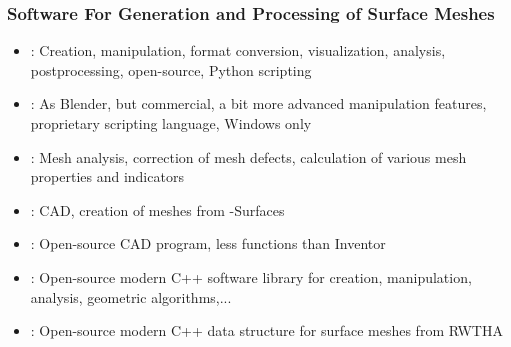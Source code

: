 \begin{frame}
\frametitle{Software For Generation and Processing of Surface Meshes}

\begin{itemize}
	\item {}: Creation, manipulation, format conversion, visualization, analysis, postprocessing, open-source, Python scripting
	\item {}: As Blender, but commercial, a bit more advanced manipulation features, proprietary scripting language, Windows only
	\item {}: Mesh analysis, correction of mesh defects, calculation of various mesh properties and indicators
	\item {}: CAD, creation of meshes from -Surfaces \cite{NURBSBOOK}
	\item {}: Open-source CAD program, less functions than Inventor
	\item {}: Open-source modern C++ software library for creation, manipulation, analysis, geometric algorithms,...
	\item {}: Open-source modern C++ data structure for surface meshes from RWTHA 	
\end{itemize}

\end{frame}

